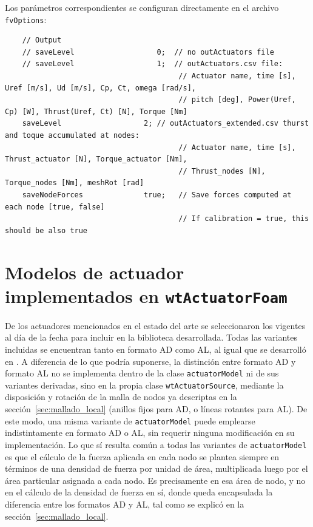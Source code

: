 Los parámetros correspondientes se configuran directamente en el archivo \texttt{fvOptions}:

\begin{scriptsize}
\begin{verbatim}
    // Output 
    // saveLevel                   0;  // no outActuators file
    // saveLevel                   1;  // outActuators.csv file: 
                                        // Actuator name, time [s], Uref [m/s], Ud [m/s], Cp, Ct, omega [rad/s],  
                                        // pitch [deg], Power(Uref, Cp) [W], Thrust(Uref, Ct) [N], Torque [Nm]
    saveLevel                   2; // outActuators_extended.csv thurst and toque accumulated at nodes:
                                        // Actuator name, time [s], Thrust_actuator [N], Torque_actuator [Nm],
                                        // Thrust_nodes [N], Torque_nodes [Nm], meshRot [rad]
    saveNodeForces              true;   // Save forces computed at each node [true, false] 
                                        // If calibration = true, this should be also true
\end{verbatim}
\end{scriptsize}

\section{Modelos de actuador implementados en \texttt{wtActuatorFoam}}
De los actuadores mencionados en el estado del arte se seleccionaron los vigentes al día de la fecha para incluir en la biblioteca desarrollada. Todas las variantes incluidas se encuentran tanto en formato AD como AL, al igual que se desarrolló en \citep{navarrodiaz2023}. A diferencia de lo que podría suponerse, la distinción entre formato AD y formato AL no se implementa dentro de la clase \texttt{actuatorModel} ni de sus variantes derivadas, sino en la propia clase \texttt{wtActuatorSource}, mediante la disposición y rotación de la malla de nodos ya descriptas en la sección~\ref{sec:mallado_local} (anillos fijos para AD, o líneas rotantes para AL). De este modo, una misma variante de \texttt{actuatorModel} puede emplearse indistintamente en formato AD o AL, sin requerir ninguna modificación en su implementación. Lo que sí resulta común a todas las variantes de \texttt{actuatorModel} es que el cálculo de la fuerza aplicada en cada nodo se plantea siempre en términos de una densidad de fuerza por unidad de área, multiplicada luego por el área particular asignada a cada nodo. Es precisamente en esa área de nodo, y no en el cálculo de la densidad de fuerza en sí, donde queda encapsulada la diferencia entre los formatos AD y AL, tal como se explicó en la sección~\ref{sec:mallado_local}.

